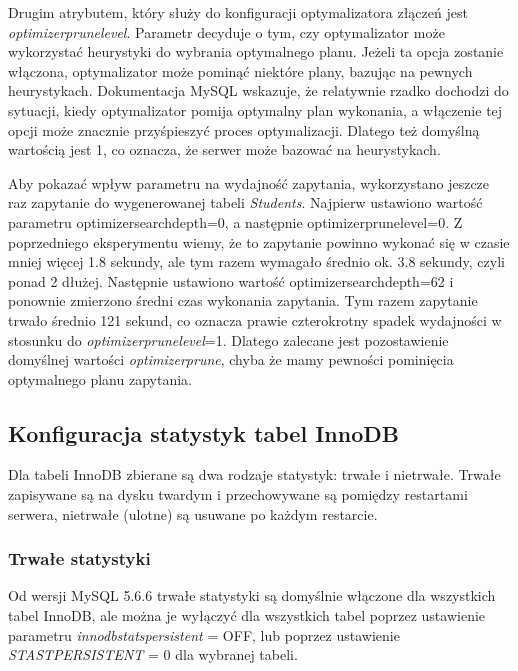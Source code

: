 Drugim atrybutem, który służy do konfiguracji optymalizatora złączeń jest \textit{optimizer\textunderscore prune\textunderscore level}. Parametr decyduje o tym, czy optymalizator może wykorzystać heurystyki do wybrania optymalnego planu. Jeżeli ta opcja zostanie włączona, optymalizator może pominąć niektóre plany, bazując na pewnych heurystykach. Dokumentacja MySQL wskazuje, że relatywnie rzadko dochodzi do sytuacji, kiedy optymalizator pomija optymalny plan wykonania, a włączenie tej opcji może znacznie przyśpieszyć proces optymalizacji. Dlatego też domyślną wartością jest 1, co oznacza, że serwer może bazować na heurystykach.

Aby pokazać wpływ parametru na wydajność zapytania, wykorzystano jeszcze raz zapytanie do wygenerowanej tabeli \textit{Students}. Najpierw ustawiono wartość parametru optimizer\textunderscore search\textunderscore depth=0, a następnie optimizer\textunderscore prune\textunderscore level=0. Z poprzedniego eksperymentu wiemy, że to zapytanie powinno wykonać się w czasie mniej więcej 1.8 sekundy, ale tym razem wymagało średnio ok. 3.8 sekundy, czyli ponad 2 dłużej. Następnie ustawiono wartość optimizer\textunderscore search\textunderscore depth=62 i ponownie zmierzono średni czas wykonania zapytania. Tym razem zapytanie trwało średnio 121 sekund, co oznacza prawie czterokrotny spadek wydajności w stosunku do \textit{optimizer\textunderscore prune\textunderscore level}=1. Dlatego zalecane jest pozostawienie domyślnej wartości \textit{ optimizer\textunderscore prune}, chyba że mamy pewności pominięcia optymalnego planu zapytania.

\subsection{Konfiguracja statystyk tabel InnoDB}
Dla tabeli InnoDB zbierane są dwa rodzaje statystyk: trwałe i nietrwałe. Trwałe zapisywane są na dysku twardym i przechowywane są pomiędzy restartami serwera, nietrwałe (ulotne) są usuwane po każdym restarcie. 

\subsubsection{Trwałe statystyki}
Od wersji MySQL 5.6.6 trwałe statystyki są domyślnie włączone dla wszystkich tabel InnoDB, ale można je wyłączyć dla wszystkich tabel poprzez ustawienie parametru \textit{innodb\textunderscore stats\textunderscore persistent} = OFF, lub poprzez ustawienie \textit{STAST\textunderscore PERSISTENT} = 0 dla wybranej tabeli.

